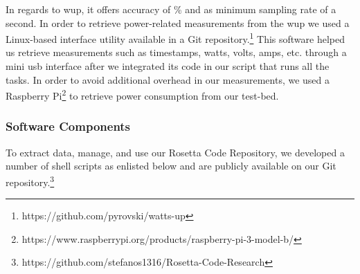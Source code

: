 In regards to {\sc wup}, it offers accuracy of \% and 
as minimum sampling rate of a second. 
In order to retrieve power-related measurements from the {\sc wup} 
we used a Linux-based interface utility available in a Git 
repository.\footnote{https://github.com/pyrovski/watts-up}
This software helped us retrieve measurements such as timestamps, 
watts, volts, amps, etc. through a mini {\sc usb} interface after 
we integrated its code in our script that runs all the tasks. 
In order to avoid additional overhead in our measurements, we 
used a Raspberry Pi\footnote{https://www.raspberrypi.org/products/raspberry-pi-3-model-b/} 
to retrieve power consumption from our test-bed.  


\subsubsection{Software Components} \label{software_components}
To extract data, manage, and use our Rosetta Code Repository, 
we developed a number of shell scripts as enlisted below and are 
publicly available on our Git repository.\footnote{https://github.com/stefanos1316/Rosetta-Code-Research} 

